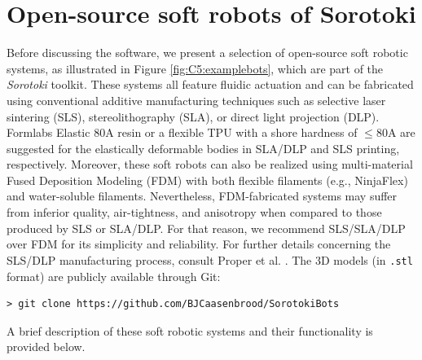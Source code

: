 \section{Open-source soft robots of Sorotoki}
Before discussing the software, we present a selection of open-source soft robotic systems, as illustrated in Figure \ref{fig:C5:examplebots}, which are part of the \textit{Sorotoki} toolkit. These systems all feature fluidic actuation and can be fabricated using conventional additive manufacturing techniques such as selective laser sintering (SLS), stereolithography (SLA), or direct light projection (DLP). Formlabs Elastic 80A resin or a flexible TPU with a shore hardness of $\le 80$A are suggested for the elastically deformable bodies in SLA/DLP and SLS printing, respectively. Moreover, these soft robots can also be realized using multi-material Fused Deposition Modeling (FDM) with both flexible filaments (e.g., NinjaFlex) and water-soluble filaments. Nevertheless, FDM-fabricated systems may suffer from inferior quality, air-tightness, and anisotropy when compared to those produced by SLS or SLA/DLP. For that reason, we recommend SLS/SLA/DLP over FDM for its simplicity and reliability. For further details concerning the SLS/DLP manufacturing process, consult Proper et al. \cite{Proper2023}. The 3D models (in \texttt{.stl} format) are publicly available through Git:
%
\begin{lstlisting}[style=terminal]
> git clone https://github.com/BJCaasenbrood/SorotokiBots
\end{lstlisting}
%
A brief description of these soft robotic systems and their functionality is provided below.
